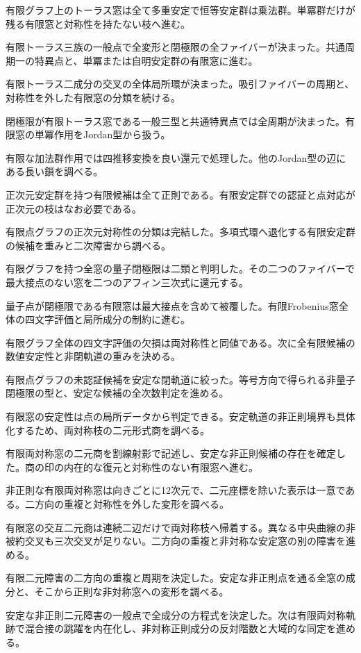 \documentclass[11pt,a4paper]{ltjsarticle}
\begin{document}
有限グラフ上のトーラス窓は全て多重安定で恒等安定群は乗法群。単冪群だけが残る有限窓と対称性を持たない枝へ進む。

有限トーラス三族の一般点で全変形と閉極限の全ファイバーが決まった。共通周期一の特異点と、単冪または自明安定群の有限窓に進む。

有限トーラス二成分の交叉の全体局所環が決まった。吸引ファイバーの周期と、対称性を外した有限窓の分類を続ける。

閉極限が有限トーラス窓である一般三型と共通特異点では全周期が決まった。有限窓の単冪作用をJordan型から扱う。

有限な加法群作用では四推移変換を良い還元で処理した。他のJordan型の辺にある長い鎖を調べる。

正次元安定群を持つ有限候補は全て正則である。有限安定群での認証と点対応が正次元の枝はなお必要である。

有限点グラフの正次元対称性の分類は完結した。多項式環へ退化する有限安定群の候補を重みと二次障害から調べる。

有限グラフを持つ全窓の量子閉極限は二類と判明した。その二つのファイバーで最大接点のない窓を二つのアフィン三次式に還元する。

量子点が閉極限である有限窓は最大接点を含めて被覆した。有限Frobenius窓全体の四文字評価と局所成分の制約に進む。

有限グラフ全体の四文字評価の欠損は両対称性と同値である。次に全有限候補の数値安定性と非閉軌道の重みを決める。

有限点グラフの未認証候補を安定な閉軌道に絞った。等号方向で得られる非量子閉極限の型と、安定な候補の全次数判定を進める。

有限窓の安定性は点の局所データから判定できる。安定軌道の非正則境界も具体化するため、両対称枝の二元形式商を調べる。

有限両対称窓の二元商を割線射影で記述し、安定な非正則候補の存在を確定した。商の印の内在的な復元と対称性のない有限窓へ進む。

非正則な有限両対称窓は向きごとに12次元で、二元座標を除いた表示は一意である。二方向の重複と対称性を外した変形を調べる。

有限窓の交互二元商は連続二辺だけで両対称枝へ帰着する。異なる中央曲線の非被約交叉も三次交叉が足りない。二方向の重複と非対称な安定窓の別の障害を進める。

有限二元障害の二方向の重複と周期を決定した。安定な非正則点を通る全窓の成分と、そこから正則な非対称窓への変形を調べる。

安定な非正則二元障害の一般点で全成分の方程式を決定した。次は有限両対称軌跡で混合接の跳躍を内在化し、非対称正則成分の反対階数と大域的な同定を進める。
\end{document}
